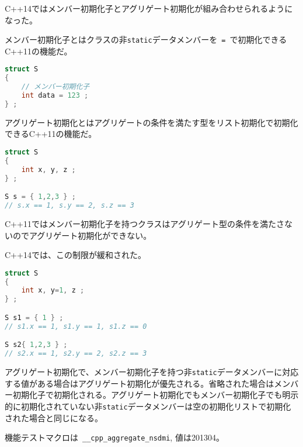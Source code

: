 %

C++14ではメンバー初期化子とアグリゲート初期化が組み合わせられるようになった。

メンバー初期化子とはクラスの非\lstinline!static!データメンバーを~\lstinline!=!~で初期化できるC++11の機能だ。

\begin{lstlisting}[language=C++]
struct S
{
    // メンバー初期化子
    int data = 123 ;
} ;
\end{lstlisting}

アグリゲート初期化とはアグリゲートの条件を満たす型をリスト初期化で初期化できるC++11の機能だ。

\begin{lstlisting}[language=C++]
struct S
{
    int x, y, z ;
} ;

S s = { 1,2,3 } ;
// s.x == 1, s.y == 2, s.z == 3
\end{lstlisting}

C++11ではメンバー初期化子を持つクラスはアグリゲート型の条件を満たさないのでアグリゲート初期化ができない。

C++14では、この制限が緩和された。

\begin{lstlisting}[language=C++]
struct S
{
    int x, y=1, z ;
} ;

S s1 = { 1 } ;
// s1.x == 1, s1.y == 1, s1.z == 0

S s2{ 1,2,3 } ;
// s2.x == 1, s2.y == 2, s2.z == 3
\end{lstlisting}

アグリゲート初期化で、メンバー初期化子を持つ非\lstinline!static!データメンバーに対応する値がある場合はアグリゲート初期化が優先される。省略された場合はメンバー初期化子で初期化される。アグリゲート初期化でもメンバー初期化子でも明示的に初期化されていない非\lstinline!static!データメンバーは空の初期化リストで初期化された場合と同じになる。

機能テストマクロは~\lstinline!__cpp_aggregate_nsdmi!, 値は201304。
